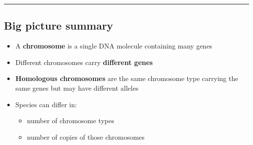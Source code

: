 \documentclass[
  letterpaper,
  DIV=11,
  numbers=noendperiod]{scrartcl}
\providecommand{\tightlist}{%
  \setlength{\itemsep}{0pt}\setlength{\parskip}{0pt}}
\begin{document}
\begin{center}\rule{0.5\linewidth}{0.5pt}\end{center}

\subsection{Big picture summary}\label{big-picture-summary}

\begin{itemize}
\tightlist
\item
  A \textbf{chromosome} is a single DNA molecule containing many genes
\item
  Different chromosomes carry \textbf{different genes}
\item
  \textbf{Homologous chromosomes} are the same chromosome type carrying
  the same genes but may have different alleles
\item
  Species can differ in:

  \begin{itemize}
  \tightlist
  \item
    number of chromosome types
  \item
    number of copies of those chromosomes
  \end{itemize}
\end{itemize}
\end{document}
